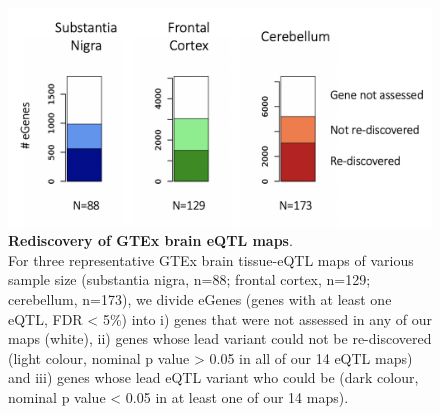 \begin{figure}[h]
\centering
\includegraphics[width=16cm]{Chapter5/Fig/neuroseq_rediscovering_gtex_brain.png}
\caption[Rediscovery of GTEx brain eQTL maps]{\textbf{Rediscovery of GTEx brain eQTL maps}.\\
For three representative GTEx brain tissue-eQTL maps of various sample size (substantia nigra, n=88; frontal cortex, n=129; cerebellum, n=173), we divide eGenes (genes with at least one eQTL, FDR < 5\%) into i) genes that were not assessed in any of our maps (white), ii) genes whose lead variant could not be re-discovered (light colour, nominal p value > 0.05 in all of our 14 eQTL maps) and iii) genes whose lead eQTL variant who could be (dark colour, nominal p value < 0.05 in at least one of our 14 maps).}
\label{fig:neuroseq_and_gtex_rediscovery}
\end{figure}








